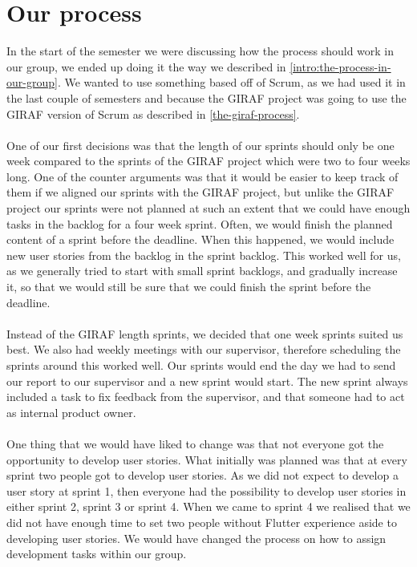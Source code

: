 \section{Our process}
In the start of the semester we were discussing how the process should work in our group, we ended up doing it the way we described in \autoref{intro:the-process-in-our-group}.
We wanted to use something based off of Scrum, as we had used it in the last couple of semesters and because the GIRAF project was going to use the GIRAF version of Scrum as described in \autoref{the-giraf-process}.
\\\\
One of our first decisions was that the length of our sprints should only be one week compared to the sprints of the GIRAF project which were two to four weeks long.
One of the counter arguments was that it would be easier to keep track of them if we aligned our sprints with the GIRAF project, but unlike the GIRAF project our sprints were not planned at such an extent that we could have enough tasks in the backlog for a four week sprint.
Often, we would finish the planned content of a sprint before the deadline.
When this happened, we would include new user stories from the backlog in the sprint backlog. 
This worked well for us, as we generally tried to start with small sprint backlogs, and gradually increase it, so that we would still be sure that we could finish the sprint before the deadline.
\\\\
Instead of the GIRAF length sprints, we decided that one week sprints suited us best.
We also had weekly meetings with our supervisor, therefore scheduling the sprints around this worked well.
Our sprints would end the day we had to send our report to our supervisor and a new sprint would start.
The new sprint always included a task to fix feedback from the supervisor, and that someone had to act as internal product owner.
\\\\
One thing that we would have liked to change was that not everyone got the opportunity to develop user stories.
What initially was planned was that at every sprint two people got to develop user stories.
As we did not expect to develop a user story at sprint 1, then everyone had the possibility to develop user stories in either sprint 2, sprint 3 or sprint 4.
When we came to sprint 4 we realised that we did not have enough time to set two people without Flutter experience aside to developing user stories.
We would have changed the process on how to assign development tasks within our group.
